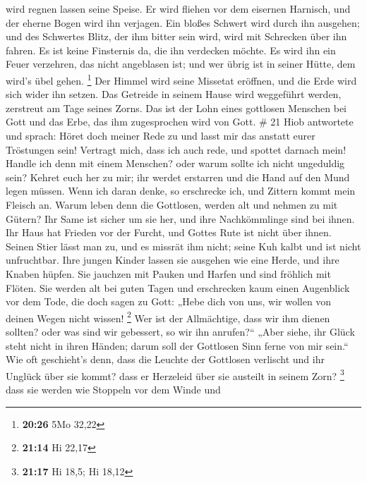 wird regnen lassen seine Speise.  Er wird fliehen vor dem
eisernen Harnisch, und der eherne Bogen wird ihn verjagen.
 Ein bloßes Schwert wird durch ihn ausgehen; und des
Schwertes Blitz, der ihm bitter sein wird, wird mit Schrecken über ihn
fahren.  Es ist keine Finsternis da, die ihn verdecken
möchte. Es wird ihn ein Feuer verzehren, das nicht angeblasen ist; und
wer übrig ist in seiner Hütte, dem wird's übel gehen. \footnote{\textbf{20:26}
  5Mo 32,22}  Der Himmel wird seine Missetat eröffnen,
und die Erde wird sich wider ihn setzen.  Das Getreide in
seinem Hause wird weggeführt werden, zerstreut am Tage seines Zorns.
 Das ist der Lohn eines gottlosen Menschen bei Gott und
das Erbe, das ihm zugesprochen wird von Gott. \# 21  Hiob
antwortete und sprach:  Höret doch meiner Rede zu und
lasst mir das anstatt eurer Tröstungen sein!  Vertragt
mich, dass ich auch rede, und spottet darnach mein! 
Handle ich denn mit einem Menschen? oder warum sollte ich nicht
ungeduldig sein?  Kehret euch her zu mir; ihr werdet
erstarren und die Hand auf den Mund legen müssen.  Wenn
ich daran denke, so erschrecke ich, und Zittern kommt mein Fleisch an.
 Warum leben denn die Gottlosen, werden alt und nehmen zu
mit Gütern?  Ihr Same ist sicher um sie her, und ihre
Nachkömmlinge sind bei ihnen.  Ihr Haus hat Frieden vor
der Furcht, und Gottes Rute ist nicht über ihnen.  Seinen
Stier lässt man zu, und es missrät ihm nicht; seine Kuh kalbt und ist
nicht unfruchtbar.  Ihre jungen Kinder lassen sie
ausgehen wie eine Herde, und ihre Knaben hüpfen.  Sie
jauchzen mit Pauken und Harfen und sind fröhlich mit Flöten.
 Sie werden alt bei guten Tagen und erschrecken kaum
einen Augenblick vor dem Tode,  die doch sagen zu Gott:
„Hebe dich von uns, wir wollen von deinen Wegen nicht wissen!
\footnote{\textbf{21:14} Hi 22,17}  Wer ist der
Allmächtige, dass wir ihm dienen sollten? oder was sind wir gebessert,
so wir ihn anrufen?{}``  „Aber siehe, ihr Glück steht
nicht in ihren Händen; darum soll der Gottlosen Sinn ferne von mir
sein.``  Wie oft geschieht's denn, dass die Leuchte der
Gottlosen verlischt und ihr Unglück über sie kommt? dass er Herzeleid
über sie austeilt in seinem Zorn? \footnote{\textbf{21:17} Hi 18,5; Hi
  18,12}  dass sie werden wie Stoppeln vor dem Winde und
